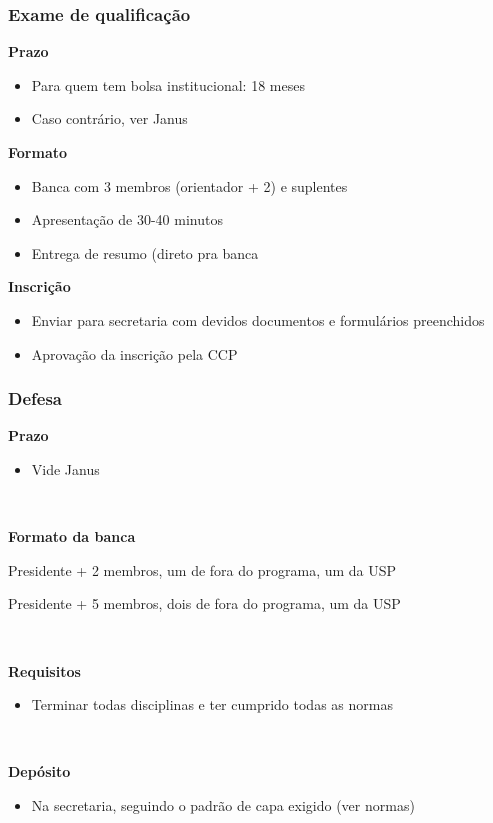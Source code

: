 \documentclass{beamer}
\begin{document}
\begin{frame}
  \frametitle{Exame de qualificação}

  \textbf{Prazo}
  \begin{itemize}
    \item Para quem tem bolsa institucional: 18 meses
    \item Caso contrário, ver Janus
  \end{itemize}\pause

  \textbf{Formato}
  \begin{itemize}
    \item Banca com 3 membros (orientador + 2) e suplentes
    \item Apresentação de 30-40 minutos
    \item Entrega de resumo (direto pra banca
  \end{itemize}\pause

  \textbf{Inscrição}
  \begin{itemize}
    \item Enviar para secretaria com devidos documentos e formulários preenchidos
    \item Aprovação da inscrição pela CCP
  \end{itemize}
\end{frame}

\begin{frame}
  \frametitle{Defesa}

  \textbf{Prazo}
  \begin{itemize}
    \item Vide Janus
  \end{itemize}~\\\pause

  \textbf{Formato da banca}
  \begin{description}[Doutorado]
    \item[Mestrado:] Presidente + 2 membros, um de fora do programa, um da USP
    \item[Doutorado:] Presidente + 5 membros, dois de fora do programa, um da USP
  \end{description}~\\\pause

  \textbf{Requisitos}
  \begin{itemize}
    \item Terminar todas disciplinas e ter cumprido todas as normas
  \end{itemize}~\\\pause

  \textbf{Depósito}
  \begin{itemize}
    \item Na secretaria, seguindo o padrão de capa exigido (ver normas)
  \end{itemize}
\end{frame}
\end{document}
